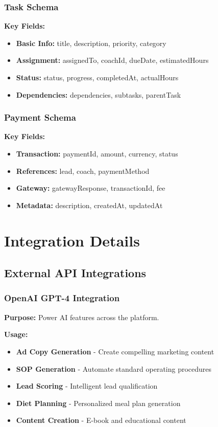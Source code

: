 \documentclass[12pt,a4paper]{article}
\begin{document}
\subsubsection{Task Schema}
\textbf{Key Fields:}
\begin{itemize}
    \item \textbf{Basic Info:} title, description, priority, category
    \item \textbf{Assignment:} assignedTo, coachId, dueDate, estimatedHours
    \item \textbf{Status:} status, progress, completedAt, actualHours
    \item \textbf{Dependencies:} dependencies, subtasks, parentTask
\end{itemize}

\subsubsection{Payment Schema}
\textbf{Key Fields:}
\begin{itemize}
    \item \textbf{Transaction:} paymentId, amount, currency, status
    \item \textbf{References:} lead, coach, paymentMethod
    \item \textbf{Gateway:} gatewayResponse, transactionId, fee
    \item \textbf{Metadata:} description, createdAt, updatedAt
\end{itemize}

\section{Integration Details}

\subsection{External API Integrations}

\subsubsection{OpenAI GPT-4 Integration}
\textbf{Purpose:} Power AI features across the platform.

\textbf{Usage:}
\begin{itemize}
    \item \textbf{Ad Copy Generation} - Create compelling marketing content
    \item \textbf{SOP Generation} - Automate standard operating procedures
    \item \textbf{Lead Scoring} - Intelligent lead qualification
    \item \textbf{Diet Planning} - Personalized meal plan generation
    \item \textbf{Content Creation} - E-book and educational content
\end{itemize}
\end{document}
